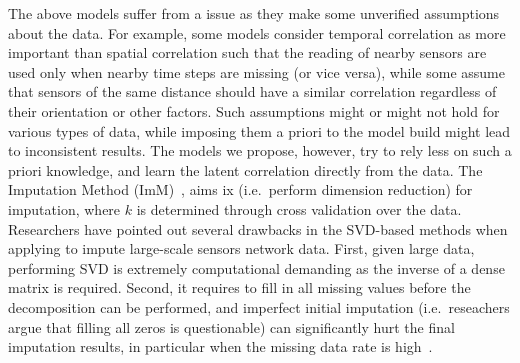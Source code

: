 The above models suffer from a issue as they make some unverified assumptions about the data. For example, some models consider temporal correlation as more important than spatial correlation such that the reading of nearby sensors are used only when nearby time steps are missing (or vice versa), while some assume that sensors of the same distance should have a similar correlation regardless of their 
orientation or other factors.  Such assumptions might or might not hold for various types of data, while imposing them a priori
to the model build might lead to inconsistent results.  The models we propose, however, try to rely less on such a priori 
knowledge, and learn the latent correlation directly from the data.  The Imputation Method (ImM)~\cite{Lim:robust}, aims ix (i.e.\
perform dimension reduction) for imputation, where $k$ is determined
through cross validation over the data.  Researchers have pointed out
several drawbacks in the SVD-based methods when applying to impute
large-scale sensors network data. First, given large data, performing
SVD is extremely computational demanding as the inverse of a dense
matrix is required. Second, it requires to fill in all missing values
before the decomposition can be performed, and imperfect initial
imputation (i.e.\ reseachers argue that filling all zeros is
questionable) can significantly hurt the final imputation results, in
particular when the missing data rate is
high~\cite{koren2009matrix,ke2005robust}.

  
